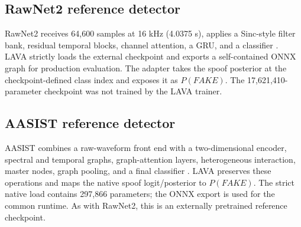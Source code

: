 \documentclass[10pt,journal,onecolumn]{IEEEtran}
\begin{document}
\subsection{RawNet2 reference detector}
RawNet2 receives 64,600 samples at 16 kHz (4.0375 s), applies a Sinc-style filter bank, residual temporal blocks, channel attention, a GRU, and a classifier \cite{tak2021rawnet2,ravanelli2018sincnet}. LAVA strictly loads the external checkpoint and exports a self-contained ONNX graph for production evaluation. The adapter takes the spoof posterior at the checkpoint-defined class index and exposes it as $P(FAKE)$. The 17,621,410-parameter checkpoint was not trained by the LAVA trainer.

\subsection{AASIST reference detector}
AASIST combines a raw-waveform front end with a two-dimensional encoder, spectral and temporal graphs, graph-attention layers, heterogeneous interaction, master nodes, graph pooling, and a final classifier \cite{jung2022aasist,velickovic2018gat}. LAVA preserves these operations and maps the native spoof logit/posterior to $P(FAKE)$. The strict native load contains 297,866 parameters; the ONNX export is used for the common runtime. As with RawNet2, this is an externally pretrained reference checkpoint.
\end{document}
